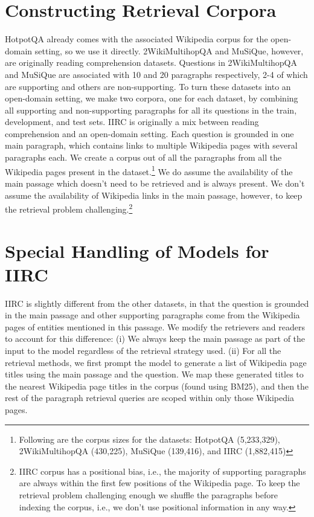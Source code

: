 \clearpage
\appendix


\section{Constructing Retrieval Corpora}
\label{sec:apndx-corpora}

HotpotQA already comes with the associated Wikipedia corpus for the open-domain setting, so we use it directly. 2WikiMultihopQA and MuSiQue, however, are originally reading comprehension datasets. Questions in 2WikiMultihopQA and MuSiQue are associated with 10 and 20 paragraphs respectively, 2-4 of which are supporting and others are non-supporting. To turn these datasets into an open-domain setting, we make two corpora, one for each dataset, by combining all supporting and non-supporting paragraphs for all its questions in the train, development, and test sets. IIRC is originally a mix between reading comprehension and an open-domain setting. Each question is grounded in one main paragraph, which contains links to multiple Wikipedia pages with several paragraphs each. We create a corpus out of all the paragraphs from all the Wikipedia pages present in the dataset.\footnote{Following are the corpus sizes for the datasets: HotpotQA (5,233,329), 2WikiMultihopQA (430,225), MuSiQue (139,416), and IIRC (1,882,415)} We do assume the availability of the main passage which doesn't need to be retrieved and is always present. We don't assume the availability of Wikipedia links in the main passage, however, to keep the retrieval problem challenging.\footnote{IIRC corpus has a positional bias, i.e., the majority of supporting paragraphs are always within the first few positions of the Wikipedia page. To keep the retrieval problem challenging enough we shuffle the paragraphs before indexing the corpus, i.e., we don't use positional information in any way.}


\section{Special Handling of Models for IIRC}
\label{sec:apndx-iirc-special-handling}

IIRC is slightly different from the other datasets, in that the question is grounded in the main passage and other supporting paragraphs come from the Wikipedia pages of entities mentioned in this passage. We modify the retrievers and readers to account for this difference: (i) We always keep the main passage as part of the input to the model regardless of the retrieval strategy used. (ii) For all the retrieval methods, we first prompt the model to generate a list of Wikipedia page titles using the main passage and the question. We map these generated titles to the nearest Wikipedia page titles in the corpus (found using BM25), and then the rest of the paragraph retrieval queries are scoped within only those Wikipedia pages.

